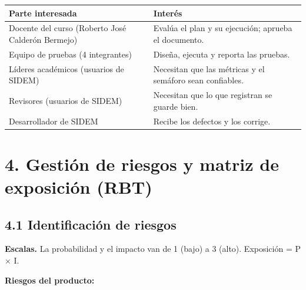 \documentclass[11pt,a4paper,oneside]{report}
\begin{document}
\par\noindent\begin{minipage}{\linewidth}\small
\begin{tabularx}{\linewidth}{>{\hsize=0.860\hsize\raggedright\arraybackslash}X>{\hsize=1.140\hsize\raggedright\arraybackslash}X}
\hline\rowcolor{cabecera}
\textbf{Parte interesada} & \textbf{Interés} \\ \hline
Docente del curso (Roberto José Calderón Bermejo) & Evalúa el plan y su ejecución; aprueba el documento. \\ \hline
Equipo de pruebas (4 integrantes) & Diseña, ejecuta y reporta las pruebas. \\ \hline
Líderes académicos (usuarios de SIDEM) & Necesitan que las métricas y el semáforo sean confiables. \\ \hline
Revisores (usuarios de SIDEM) & Necesitan que lo que registran se guarde bien. \\ \hline
Desarrollador de SIDEM & Recibe los defectos y los corrige. \\ \hline
\end{tabularx}\end{minipage}\par


\section*{4. Gestión de riesgos y matriz de exposición (RBT)}

\subsection*{4.1 Identificación de riesgos}

\textbf{Escalas.} La probabilidad y el impacto van de 1 (bajo) a 3 (alto). Exposición = P × I.


\Needspace{150pt}\textbf{Riesgos del producto:}
\end{document}
